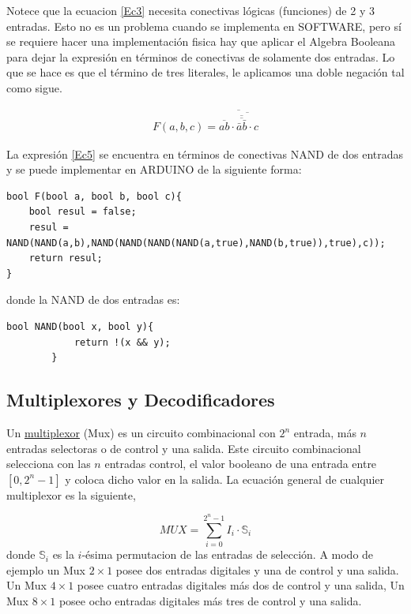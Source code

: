 Notece que la ecuacion \eqref{Ec3} necesita conectivas lógicas (funciones) de 2 y 3 entradas. Esto no es un problema cuando se implementa en SOFTWARE, pero sí se requiere hacer una implementación fisica hay que aplicar el Algebra Booleana para dejar la expresión en términos de conectivas de solamente dos entradas. Lo que se hace es que el término de tres literales, le aplicamos una doble negación tal como sigue.

\begin{eqnarray}
\label{Ec5}
F(a,b,c)=\overline{\overline{ab}\cdot\overline{\overline{\overline{\bar{a}\bar{b}}}\cdot c}} 
\end{eqnarray}

La expresión \eqref{Ec5} se encuentra en términos de conectivas NAND de dos entradas y se puede implementar en ARDUINO  de la siguiente forma:
{\footnotesize 
\begin{lstlisting}[language=Arduino,numbers=none, showstringspaces=false]
bool F(bool a, bool b, bool c){
	bool resul = false;
	resul = NAND(NAND(a,b),NAND(NAND(NAND(NAND(a,true),NAND(b,true)),true),c));
	return resul;
}
\end{lstlisting} 
}
donde la NAND de dos entradas es:

		\begin{lstlisting}[language=Arduino,numbers=none, showstringspaces=false]
		bool NAND(bool x, bool y){
			return !(x && y);
		}
		\end{lstlisting}

\subsection{Multiplexores y Decodificadores}

Un \href{https://es.wikipedia.org/wiki/Multiplexor}{multiplexor} (Mux) es un circuito combinacional con $2^{n}$ entrada, más $n$  entradas selectoras o de control y una salida. Este circuito combinacional selecciona con las $n$ entradas control,  el valor booleano de una entrada entre $\left[ 0,2^{n}-1\right]$ y coloca dicho valor en la salida. La ecuación general de cualquier multiplexor es la siguiente,

\begin{equation}
MUX=\sum_{i=0}^{2^{n}-1} I_{i}\cdot \mathbb{S}_i
\end{equation}
donde $\mathbb{S}_i$  es la $i$-ésima permutacion de las entradas de selección. A modo de ejemplo un Mux $2 \times 1$
 posee dos entradas digitales y una de control y una salida. Un Mux $4 \times 1$ posee cuatro entradas digitales más dos de control y una salida, Un Mux $8 \times 1$ posee ocho entradas digitales más tres de control y una salida.
 
